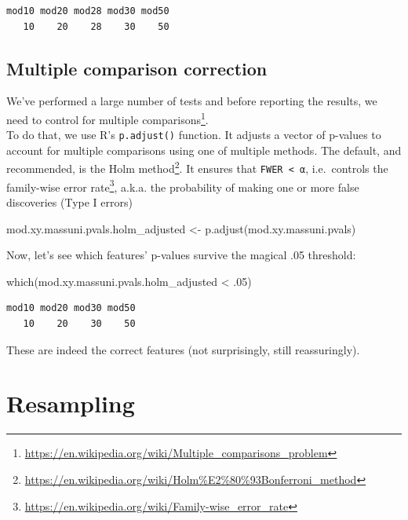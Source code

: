 \documentclass[
]{book}
\newenvironment{Shaded}{\begin{snugshade}}{\end{snugshade}}
\newcommand{\DecValTok}[1]{\textcolor[rgb]{0.00,0.00,0.81}{#1}}
\newcommand{\FunctionTok}[1]{\textcolor[rgb]{0.00,0.00,0.00}{#1}}
\newcommand{\NormalTok}[1]{#1}
\newcommand{\OtherTok}[1]{\textcolor[rgb]{0.56,0.35,0.01}{#1}}
\newcommand{\SpecialCharTok}[1]{\textcolor[rgb]{0.00,0.00,0.00}{#1}}
\DeclareRobustCommand{\href}[2]{#2\footnote{\url{#1}}}
\begin{document}
\begin{verbatim}
mod10 mod20 mod28 mod30 mod50 
   10    20    28    30    50 
\end{verbatim}

\hypertarget{multiple-comparison-correction}{%
\section{Multiple comparison correction}\label{multiple-comparison-correction}}

We've performed a large number of tests and before reporting the results, we need to control for \href{https://en.wikipedia.org/wiki/Multiple_comparisons_problem}{multiple comparisons}.\\
To do that, we use R's \texttt{p.adjust()} function. It adjusts a vector of p-values to account for multiple comparisons using one of multiple methods. The default, and recommended, is the \href{https://en.wikipedia.org/wiki/Holm\%E2\%80\%93Bonferroni_method}{Holm method}. It ensures that \texttt{FWER\ \textless{}\ α}, i.e.~controls the \href{https://en.wikipedia.org/wiki/Family-wise_error_rate}{family-wise error rate}, a.k.a. the probability of making one or more false discoveries (Type I errors)

\begin{Shaded}
\begin{Highlighting}[]
\NormalTok{mod.xy.massuni.pvals.holm\_adjusted }\OtherTok{\textless{}{-}} \FunctionTok{p.adjust}\NormalTok{(mod.xy.massuni.pvals)}
\end{Highlighting}
\end{Shaded}

Now, let's see which features' p-values survive the magical .05 threshold:

\begin{Shaded}
\begin{Highlighting}[]
\FunctionTok{which}\NormalTok{(mod.xy.massuni.pvals.holm\_adjusted }\SpecialCharTok{\textless{}}\NormalTok{ .}\DecValTok{05}\NormalTok{)}
\end{Highlighting}
\end{Shaded}

\begin{verbatim}
mod10 mod20 mod30 mod50 
   10    20    30    50 
\end{verbatim}

These are indeed the correct features (not surprisingly, still reassuringly).

\hypertarget{resampling}{%
\chapter{Resampling}\label{resampling}}
\end{document}
